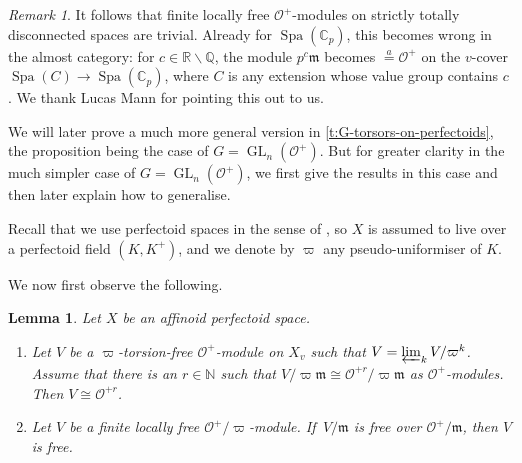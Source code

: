 \documentclass[11pt]{amsart}
\numberwithin{equation}{section}
\newtheorem{Lemma}[thm]{Lemma}
\theoremstyle{definition}
\theoremstyle{remark}
\newtheorem{Remark}[thm]{Remark}
\newcommand{\C}{\mathbb{C}}
\newcommand{\N}{\mathbb{N}}
\renewcommand{\O}{\mathcal{O}}
\newcommand{\Q}{\mathbb{Q}}
\newcommand{\m}{\mathfrak{m}}
\newcommand{\GL}{\operatorname{GL}}
\newcommand{\Spa}{\operatorname{Spa}}
\newcommand{\aeq}{\stackrel{a}{=}}
\begin{document}
\begin{Remark}
 	It follows that finite locally free $\O^+$-modules on strictly totally disconnected spaces are trivial.
 	Already for $\Spa(\C_p)$, this becomes wrong in the almost category: for $c\in \mathbb R\backslash \Q$, the module $p^{c}\m$ becomes $\aeq \O^+$ on the $v$-cover $\Spa(C)\to \Spa(\C_p)$, where $C$ is any extension whose value group contains $c$.  We thank Lucas Mann for pointing this out to us.
\end{Remark}

We will later prove a much more general version in \cref{t:G-torsors-on-perfectoids}, the proposition being the case of $G=\GL_n(\O^+)$.  But for greater clarity in the much simpler case of $G=\GL_n(\O^+)$, we first give the results in this case and then later explain how to generalise.
 
 Recall that we use perfectoid spaces in the sense of \cite{perfectoid-spaces}, so $X$ is assumed to live over a perfectoid field $(K,K^+)$, and we denote by $\varpi$ any pseudo-uniformiser of $K$.
 
 We now first observe the following.


\begin{Lemma}\label{l:local-freeness--in-the-limit-in-the-v-topology}
	Let $X$ be an affinoid perfectoid space. 
	\begin{enumerate}
		\item\label{l:226-1} Let $V$ be a $\varpi$-torsion-free $\O^+$-module on $X_v$ such that $V=\varprojlim_k V/\varpi^k$. Assume that there is an $r\in \N$ such that $V/\varpi\m\cong \O^{+r}/\varpi\m$ as $\O^+$-modules. Then $V\cong \O^{+r}$. 
		\item\label{l:226-2} Let $V$ be a finite locally free $\O^+/\varpi$-module. If\, $V/\m$ is free over $\O^+/\m$, then $V$ is free.
	\end{enumerate}
\end{Lemma}
\end{document}
